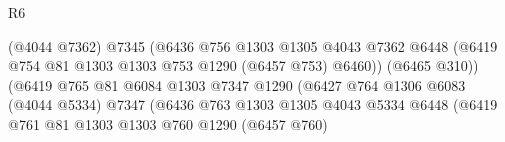 \begin{lexlean}{R6}
\begin{coremodule}
                                              (@4044 @7362)
                                              @7345
                                              (@6436
                                                @756
                                                @1303
                                                @1305
                                                @4043
                                                @7362
                                                @6448
                                                (@6419
                                                  @754
                                                  @81
                                                  @1303
                                                  @1303
                                                  @753
                                                  @1290
                                                  (@6457 @753)
                                                  @6460))
                                              (@6465 @310))
                                            (@6419
                                              @765
                                              @81
                                              @6084
                                              @1303
                                              @7347
                                              @1290
                                              (@6427
                                                @764
                                                @1306
                                                @6083
                                                (@4044 @5334)
                                                @7347
                                                (@6436
                                                  @763
                                                  @1303
                                                  @1305
                                                  @4043
                                                  @5334
                                                  @6448
                                                  (@6419
                                                    @761
                                                    @81
                                                    @1303
                                                    @1303
                                                    @760
                                                    @1290
                                                    (@6457 @760)

\end{coremodule}
\end{lexlean}
